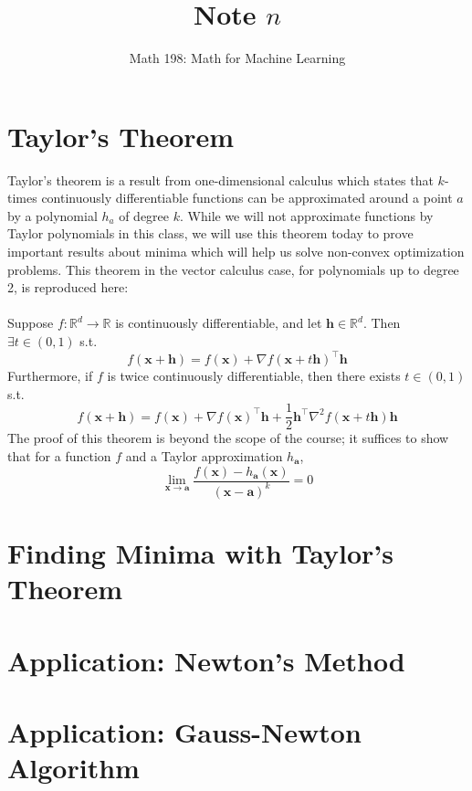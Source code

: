 \documentclass{article}
\title{Note $n$}
\author{Math 198: Math for Machine Learning}
\date{}
\begin{document}
\maketitle

\section{Taylor's Theorem}
Taylor's theorem is a result from one-dimensional calculus which states that $k$-times continuously differentiable functions can be approximated around a point $a$ by a polynomial $h_a$ of degree $k$. While we will not approximate functions by Taylor polynomials in this class, we will use this theorem today to prove important results about minima which will help us solve non-convex optimization problems. This theorem in the vector calculus case, for polynomials up to degree 2, is reproduced here:\\\\ Suppose $f: \mathbb{R}^d \rightarrow \mathbb{R}$ is continuously differentiable, and let $\mathbf{h} \in \mathbb{R}^d$. Then $\exists t \in (0, 1)$ s.t. $$f(\mathbf{x + h}) = f(\mathbf{x}) + \nabla f(\mathbf{x} + t\mathbf{h})^{\top}\mathbf{h}$$ Furthermore, if $f$ is twice continuously differentiable, then there exists $t \in (0, 1)$ s.t. $$f(\mathbf{x + h}) = f(\mathbf{x}) + \nabla f(\mathbf{x})^{\top}\mathbf{h} + \frac{1}{2}\mathbf{h}^{\top}\nabla^2f(\mathbf{x} + t\mathbf{h})\mathbf{h}$$ The proof of this theorem is beyond the scope of the course; it suffices to show that for a function $f$ and a Taylor approximation $h_{\mathbf{a}}$, $$\lim\limits_{\mathbf{x \rightarrow a}} \frac{f(\mathbf{x}) - h_\mathbf{a}(\mathbf{x})}{(\mathbf{x} - \mathbf{a})^k} = 0$$

\section{Finding Minima with Taylor's Theorem}

\clearpage
\section*{Application: Newton's Method}

\clearpage

\section*{Application: Gauss-Newton Algorithm}
\end{document}
